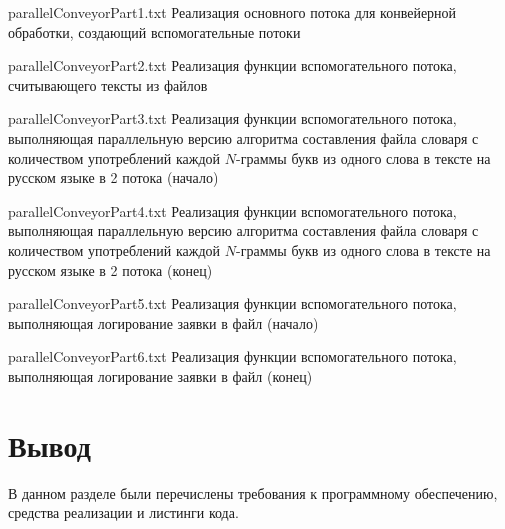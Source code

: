 {parallelConveyorPart1.txt} %
{Реализация основного потока для конвейерной обработки, создающий вспомогательные потоки} %

\clearpage

{parallelConveyorPart2.txt} %
{Реализация функции вспомогательного потока, считывающего тексты из файлов} %

{parallelConveyorPart3.txt} %
{Реализация функции вспомогательного потока, выполняющая параллельную версию алгоритма составления файла словаря с количеством употреблений каждой $N$-граммы букв из одного слова в тексте на русском языке в 2 потока (начало)} %

{parallelConveyorPart4.txt} %
{Реализация функции вспомогательного потока, выполняющая параллельную версию алгоритма составления файла словаря с количеством употреблений каждой $N$-граммы букв из одного слова в тексте на русском языке в 2 потока (конец)} %

{parallelConveyorPart5.txt} %
{Реализация функции вспомогательного потока, выполняющая логирование заявки в файл (начало)} %

{parallelConveyorPart6.txt} %
{Реализация функции вспомогательного потока, выполняющая логирование заявки в файл (конец)} %

\section*{Вывод}

В данном разделе были перечислены требования к программному обеспечению, средства реализации и листинги кода.

    